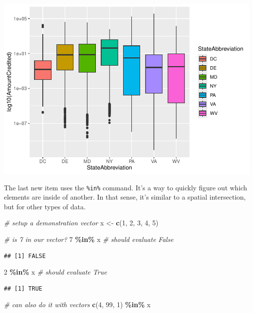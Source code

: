\documentclass[]{article}
\newenvironment{Shaded}{\begin{snugshade}}{\end{snugshade}}
\newcommand{\CommentTok}[1]{\textcolor[rgb]{0.56,0.35,0.01}{\textit{#1}}}
\newcommand{\DecValTok}[1]{\textcolor[rgb]{0.00,0.00,0.81}{#1}}
\newcommand{\FunctionTok}[1]{\textcolor[rgb]{0.13,0.29,0.53}{\textbf{#1}}}
\newcommand{\NormalTok}[1]{#1}
\newcommand{\OtherTok}[1]{\textcolor[rgb]{0.56,0.35,0.01}{#1}}
\newcommand{\SpecialCharTok}[1]{\textcolor[rgb]{0.81,0.36,0.00}{\textbf{#1}}}
\begin{document}
\includegraphics{lab02_files/figure-latex/review3-4.pdf}

The last new item uses the \texttt{\%in\%} command. It's a way to
quickly figure out which elements are inside of another. In that sense,
it's similar to a spatial intersection, but for other types of data.

\begin{Shaded}
\begin{Highlighting}[]
\CommentTok{\# setup a demonstration vector}
\NormalTok{x }\OtherTok{\textless{}{-}} \FunctionTok{c}\NormalTok{(}\DecValTok{1}\NormalTok{, }\DecValTok{2}\NormalTok{, }\DecValTok{3}\NormalTok{, }\DecValTok{4}\NormalTok{, }\DecValTok{5}\NormalTok{)}

\CommentTok{\# is 7 in our vector?}
\DecValTok{7} \SpecialCharTok{\%in\%}\NormalTok{ x }\CommentTok{\# should evaluate False}
\end{Highlighting}
\end{Shaded}

\begin{verbatim}
## [1] FALSE
\end{verbatim}

\begin{Shaded}
\begin{Highlighting}[]
\DecValTok{2} \SpecialCharTok{\%in\%}\NormalTok{ x }\CommentTok{\# should evaluate True}
\end{Highlighting}
\end{Shaded}

\begin{verbatim}
## [1] TRUE
\end{verbatim}

\begin{Shaded}
\begin{Highlighting}[]
\CommentTok{\# can also do it with vectors}
\FunctionTok{c}\NormalTok{(}\DecValTok{4}\NormalTok{, }\DecValTok{99}\NormalTok{, }\DecValTok{1}\NormalTok{) }\SpecialCharTok{\%in\%}\NormalTok{ x}
\end{Highlighting}
\end{Shaded}
\end{document}
